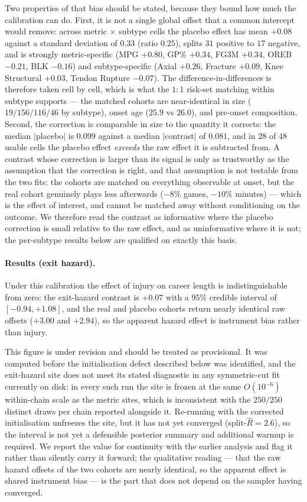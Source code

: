 Two properties of that bias should be stated, because they bound how much the calibration can do.  First, it is not a single global offset that a common intercept would remove: across metric $\times$ subtype cells the placebo effect has mean $+0.08$ against a standard deviation of $0.33$ (ratio $0.25$), splits $31$ positive to $17$ negative, and is strongly metric-specific (MPG $+0.80$, GP\% $+0.34$, FG3M $+0.34$, OREB $-0.21$, BLK $-0.16$) and subtype-specific (Axial $+0.26$, Fracture $+0.09$, Knee Structural $+0.03$, Tendon Rupture $-0.07$).  The difference-in-differences is therefore taken cell by cell, which is what the $1{:}1$ risk-set matching within subtype supports --- the matched cohorts are near-identical in size ($19/156/116/46$ by subtype), onset age ($25.9$ vs $26.0$), and pre-onset composition.  Second, the correction is comparable in size to the quantity it corrects: the median $|$placebo$|$ is $0.099$ against a median $|$contrast$|$ of $0.081$, and in $28$ of $48$ usable cells the placebo effect \emph{exceeds} the raw effect it is subtracted from.  A contrast whose correction is larger than its signal is only as trustworthy as the assumption that the correction is right, and that assumption is not testable from the two fits: the cohorts are matched on everything observable at onset, but the real cohort genuinely plays less afterwards ($-8\%$ games, $-10\%$ minutes) --- which is the effect of interest, and cannot be matched away without conditioning on the outcome.  We therefore read the contrast as informative where the placebo correction is small relative to the raw effect, and as uninformative where it is not; the per-subtype results below are qualified on exactly this basis.

\paragraph{Results (exit hazard).}  Under this calibration the effect of injury on career length is indistinguishable from zero: the exit-hazard contrast is $+0.07$ with a $95\%$ credible interval of $[-0.94, +1.08]$, and the real and placebo cohorts return nearly identical raw offsets ($+3.00$ and $+2.94$), so the apparent hazard effect is instrument bias rather than injury.

This figure is under revision and should be treated as provisional.  It was computed before the initialisation defect described below was identified, and the exit-hazard site does not meet its stated diagnostic in any symmetric-cut fit currently on disk: in every such run the site is frozen at the same $O(10^{-6})$ within-chain scale as the metric sites, which is inconsistent with the $250/250$ distinct draws per chain reported alongside it.  Re-running with the corrected initialisation unfreezes the site, but it has not yet converged (split-$\hat{R} = 2.6$), so the interval is not yet a defensible posterior summary and additional warmup is required.  We report the value for continuity with the earlier analysis and flag it rather than silently carry it forward; the qualitative reading --- that the raw hazard offsets of the two cohorts are nearly identical, so the apparent effect is shared instrument bias --- is the part that does not depend on the sampler having converged.

